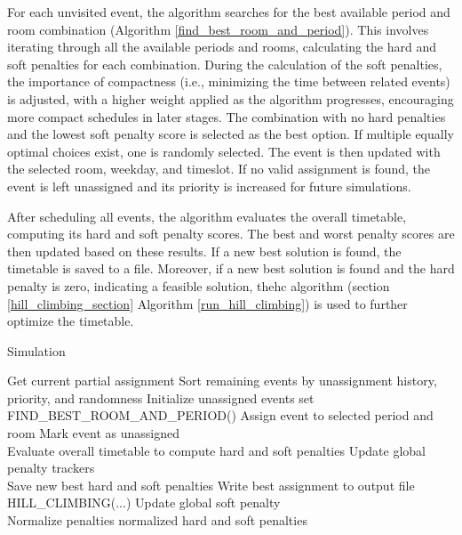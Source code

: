 For each unvisited event, the algorithm searches for the best available period and room combination (Algorithm \ref{find_best_room_and_period}). This involves iterating through all the available periods and rooms, calculating the hard and soft penalties for each combination. During the calculation of the soft penalties, the importance of compactness (i.e., minimizing the time between related events) is adjusted, with a higher weight applied as the algorithm progresses, encouraging more compact schedules in later stages. The combination with no hard penalties and the lowest soft penalty score is selected as the best option. If multiple equally optimal choices exist, one is randomly selected. The event is then updated with the selected room, weekday, and timeslot. If no valid assignment is found, the event is left unassigned and its priority is increased for future simulations.

After scheduling all events, the algorithm evaluates the overall timetable, computing its hard and soft penalty scores. The best and worst penalty scores are then updated based on these results. If a new best solution is found, the timetable is saved to a file. Moreover, if a new best solution is found and the hard penalty is zero, indicating a feasible solution, the\ac{hc} algorithm (section \ref{hill_climbing_section} Algorithm \ref{run_hill_climbing}) is used to further optimize the timetable.

\begin{algorithm}
\caption{Simulation}\label{simulation}
\begin{algorithmic}[1]
    \State Get current partial assignment
    \State Sort remaining events by unassignment history, priority, and randomness
    \State Initialize unassigned events set
\\
        \State FIND\_BEST\_ROOM\_AND\_PERIOD()
            \State Assign event to selected period and room
        \Else
            \State Mark event as unassigned
        \EndIf
    \EndFor
\\
    \State Evaluate overall timetable to compute hard and soft penalties
    \State Update global penalty trackers
\\
        \State Save new best hard and soft penalties
        \State Write best assignment to output file
            \State HILL\_CLIMBING(...)
            \State Update global soft penalty
        \EndIf
    \EndIf
\\
    \State Normalize penalties
    \State \Return normalized hard and soft penalties
\EndFunction
\end{algorithmic}
\end{algorithm}

